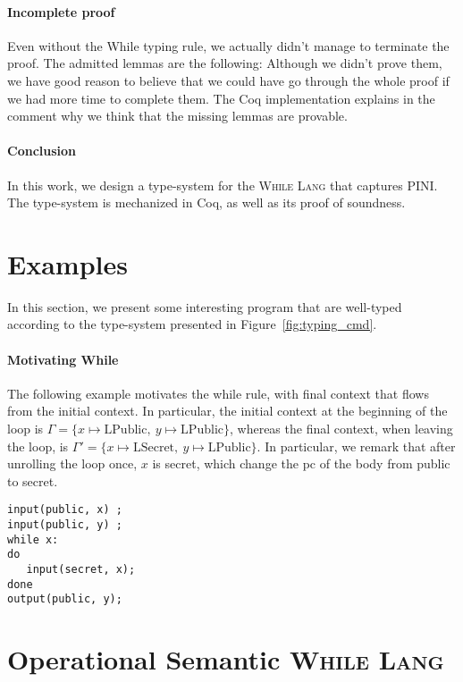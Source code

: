 \documentclass[10pt]{article}
\newcommand{\ctx}{\Gamma}
\newcommand{\public}{\mathrm{LPublic}}
\newcommand{\secret}{\mathrm{LSecret}}
\newcommand{\whilelang}{\textsc{While Lang} }
\begin{document}
\paragraph{Incomplete proof}
Even without the While typing rule, we actually didn't manage to terminate the proof.
The admitted lemmas are the following:
Although we didn't prove them, we have good reason to believe that we could have go through the
whole proof if we had more time to complete them. The Coq implementation explains in the comment why
we think that the missing lemmas are provable.

\paragraph{Conclusion}
In this work, we design a type-system for the \whilelang that captures PINI.
The type-system is mechanized in Coq, as well as its proof of soundness.

\appendix

\section{Examples}%
\label{sec:examples}

In this section, we present some interesting program that are well-typed according to the
type-system presented in Figure~\ref{fig:typing_cmd}.

\paragraph{Motivating While}
The following example motivates the while rule, with final context that flows from the initial
context. In particular, the initial context at the beginning of the loop is
$\ctx = \{ x \mapsto \public,\ y \mapsto \public \}$, whereas the final context, when leaving the
loop, is $\ctx' = \{ x \mapsto \secret,\ y \mapsto \public \}$. In particular, we remark that after
unrolling the loop once, $x$ is secret, which change the pc of the body from public to secret.
\begin{verbatim}
input(public, x) ;
input(public, y) ;
while x:
do
   input(secret, x);
done
output(public, y);
\end{verbatim}

\section{Operational Semantic \whilelang}%


% 
% 
\end{document}
